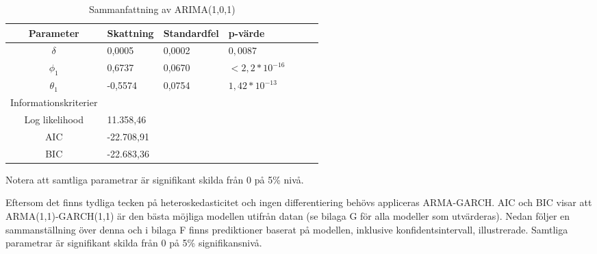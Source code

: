 \documentclass[11pt]{article}
\numberwithin{equation}{section}
\numberwithin{table}{section}
\numberwithin{figure}{section}
\begin{document}
\begin{table}[H]
\caption{Sammanfattning av ARIMA(1,0,1)}
\begin{tabularx}{\textwidth}{c *{6}{Y}}
\toprule

Parameter  & Skattning & Standardfel & p-värde \\
\hline

$\delta$        & 0,0005  & 0,0002  & $0,0087$   \\
$\phi_1$        & 0,6737  & 0,0670  & $<2,2*10^{-16}$   \\

$\theta_1$      & -0,5574 & 0,0754  &  $1,42*10^{-13}$   \\
\midrule

Informationskriterier  & &  &  \\
\hline

Log likelihood        & 11.358,46 \\
AIC                   & -22.708,91 \\

BIC                   & -22.683,36 \\
\bottomrule
\end{tabularx}
\footnotesize{Notera att samtliga parametrar är signifikant skilda från 0 på 5\% nivå.}
\end{table}


Eftersom det finns tydliga tecken på heteroskedasticitet och ingen differentiering behövs appliceras ARMA-GARCH. AIC och BIC visar att ARMA(1,1)-GARCH(1,1) är den bästa möjliga modellen utifrån datan (se bilaga G för alla modeller som utvärderas). Nedan följer en sammanställning över denna och i bilaga F finns prediktioner baserat på modellen, inklusive konfidentsintervall, illustrerade. Samtliga parametrar är signifikant skilda från 0 på 5\% signifikansnivå.
\end{document}
